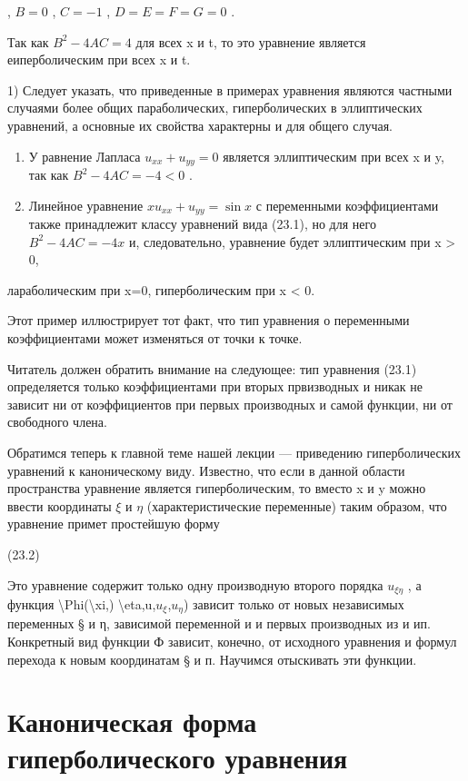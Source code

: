 \documentclass[
]{article}
\begin{document}
{{, \(B=0\) , \(C=-1\) , \(D=E=F=G=0\) .

Так как \(B^2 - 4AC = 4\) для всех x и t, то это уравнение является
еиперболическим при всех x и t.

1) Следует указать, что приведенные в примерах уравнения являются
частными случаями более общих параболических, гиперболических в
эллиптических уравнений, а основные их свойства характерны и для общего
случая.

\begin{enumerate}
\def\labelenumi{\arabic{enumi}.}
\setcounter{enumi}{2}
\item
  У равнение Лапласа \(u_{xx} + u_{yy} = 0\) является эллиптическим при
  всех x и y, так как \(B^2 - 4AC = - 4 < 0\) .
\item
  Линейное уравнение \(xu_{xx} + u_{yy} = \sin x\) с переменными
  коэффициентами также принадлежит классу уравнений вида (23.1), но для
  него \(B^2-4AC=-4x\) и, следовательно, уравнение будет эллиптическим
  при x \textgreater{} 0,
\end{enumerate}

лараболическим при x=0, гиперболическим при x \textless{} 0.

Этот пример иллюстрирует тот факт, что тип уравнения о переменными
коэффициентами может изменяться от точки к точке.

Читатель должен обратить внимание на следующее: тип уравнения (23.1)
определяется только коэффициентами при вторых првизводных и никак не
зависит ни от коэффициентов при первых производных и самой функции, ни
от свободного члена.

Обратимся теперь к главной теме нашей лекции --- приведению
гиперболических уравнений к каноническому виду. Известно, что если в
данной области пространства уравнение является гиперболическим, то
вместо x и y можно ввести координаты \(\xi\) и \(\eta\)
(характеристические переменные) таким образом, что уравнение примет
простейшую форму

(23.2)

Это уравнение содержит только одну производную второго порядка
\(u_{\xi\eta}\) , а функция \textbackslash Phi(\textbackslash xi,)
\textbackslash eta,u,\(u_{\xi}\),\(u_{\eta}\)) зависит только от новых
независимых переменных § и η, зависимой переменной и и первых
производных из и ип. Конкретный вид функции Ф зависит, конечно, от
исходного уравнения и формул перехода к новым координатам § и п.
Научимся отыскивать эти функции.

\section{Каноническая форма гиперболического
уравнения}\label{ux43aux430ux43dux43eux43dux438ux447ux435ux441ux43aux430ux44f-ux444ux43eux440ux43cux430-ux433ux438ux43fux435ux440ux431ux43eux43bux438ux447ux435ux441ux43aux43eux433ux43e-ux443ux440ux430ux432ux43dux435ux43dux438ux44f}

}}
\end{document}

